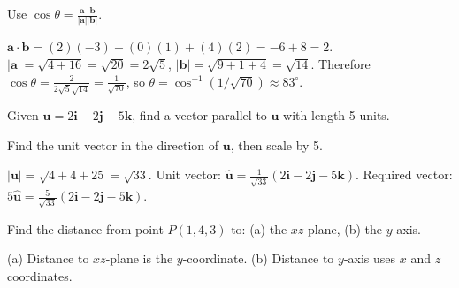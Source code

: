 \begin{hint}
Use $\cos \theta = \frac{\mathbf{a} \cdot \mathbf{b}}{|\mathbf{a}||\mathbf{b}|}$.
\end{hint}

\begin{solution}[Sketch]
$\mathbf{a} \cdot \mathbf{b} = (2)(-3) + (0)(1) + (4)(2) = -6 + 8 = 2$. $|\mathbf{a}| = \sqrt{4 + 16} = \sqrt{20} = 2\sqrt{5}$, $|\mathbf{b}| = \sqrt{9 + 1 + 4} = \sqrt{14}$. Therefore $\cos \theta = \frac{2}{2\sqrt{5}\sqrt{14}} = \frac{1}{\sqrt{70}}$, so $\theta = \cos^{-1}(1/\sqrt{70}) \approx 83^\circ$.
\end{solution}

\vspace{1em}

\begin{problem}
Given $\mathbf{u} = 2\mathbf{i} - 2\mathbf{j} - 5\mathbf{k}$, find a vector parallel to $\mathbf{u}$ with length 5 units.
\end{problem}

\begin{hint}
Find the unit vector in the direction of $\mathbf{u}$, then scale by 5.
\end{hint}

\begin{solution}[Sketch]
$|\mathbf{u}| = \sqrt{4 + 4 + 25} = \sqrt{33}$. Unit vector: $\hat{\mathbf{u}} = \frac{1}{\sqrt{33}}(2\mathbf{i} - 2\mathbf{j} - 5\mathbf{k})$. Required vector: $5\hat{\mathbf{u}} = \frac{5}{\sqrt{33}}(2\mathbf{i} - 2\mathbf{j} - 5\mathbf{k})$.
\end{solution}

\vspace{1em}

\begin{problem}
Find the distance from point $P(1, 4, 3)$ to: (a) the $xz$-plane, (b) the $y$-axis.
\end{problem}

\begin{hint}
(a) Distance to $xz$-plane is the $y$-coordinate. (b) Distance to $y$-axis uses $x$ and $z$ coordinates.
\end{hint}

